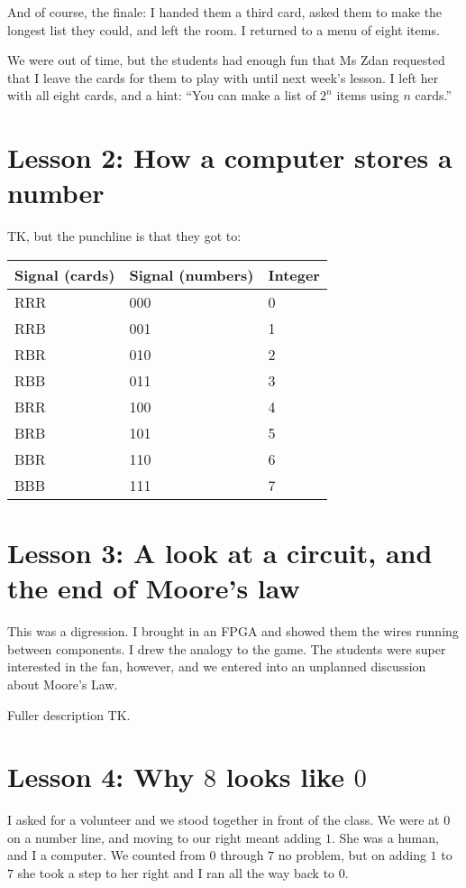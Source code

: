\documentclass[sigplan,review]{acmart}
\begin{document}
And of course, the finale: I handed them a third card, asked them to make the longest list they could, and left the room.
I returned to a menu of eight items.

We were out of time, but the students had enough fun that Ms Zdan requested that I leave the cards for them to play with until next week's lesson.
I left her with all eight cards, and a hint: ``You can make a list of $2^n$ items using $n$ cards.''


\section*{Lesson 2: How a computer stores a number}

TK, but the punchline is that they got to:

\begin{table}[h]\sffamily
  \begin{tabular}{lll}
  Signal (cards) & Signal (numbers) & Integer \\
  \midrule
  RRR & 000 & 0 \\
  RRB & 001 & 1 \\
  RBR & 010 & 2 \\
  RBB & 011 & 3 \\
  BRR & 100 & 4 \\
  BRB & 101 & 5 \\
  BBR & 110 & 6 \\
  BBB & 111 & 7 \\
  \end{tabular}
\end{table}

\section*{Lesson 3: A look at a circuit, and the end of Moore's law}

This was a digression.
I brought in an FPGA and showed them the wires running between components.
I drew the analogy to the game.
The students were super interested in the fan, however, and we entered into an unplanned discussion about Moore's Law.

Fuller description TK.

\section*{Lesson 4: Why $8$ looks like $0$}

I asked for a volunteer and we stood together in front of the class.
We were at $0$ on a number line, and moving to our right meant adding $1$.
She was a human, and I a computer.
We counted from $0$ through $7$ no problem, but on adding $1$ to $7$ she took a step to her right and I ran all the way back to $0$.
\end{document}
